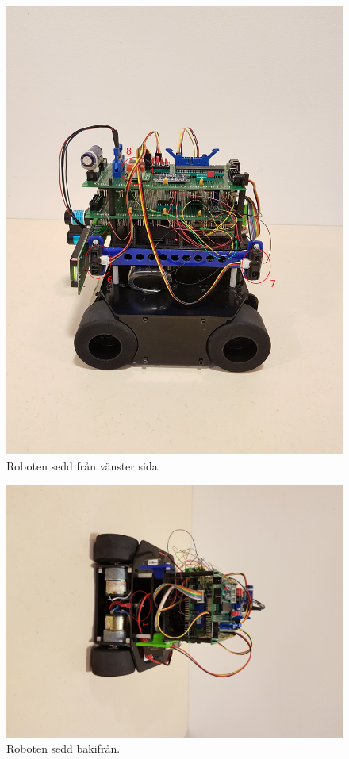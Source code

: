 \documentclass{article}
\begin{document}
\clearpage
\begin{figure}[H]
\centering
\includegraphics[scale=0.1]{robot_left_side}
\caption{Roboten sedd från vänster sida.}
\label{fig:robot_left_side}
\end{figure}

\clearpage
\begin{figure}[H]
\centering
\includegraphics[scale=0.1]{robot_back}
\caption{Roboten sedd bakifrån.}
\label{fig:robot_back}
\end{figure}
\end{document}
